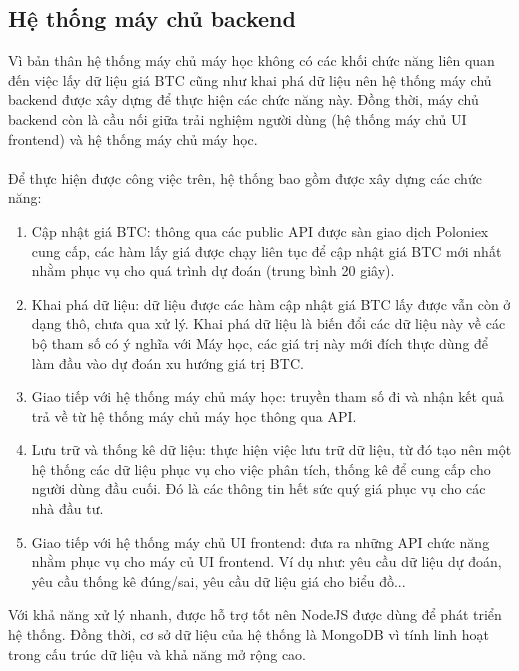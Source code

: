 \subsection{ Hệ thống máy chủ backend}
Vì bản thân hệ thống máy chủ máy học không có các khối chức năng liên quan đến 
việc lấy dữ liệu giá BTC cũng như khai phá dữ liệu nên hệ thống máy chủ backend 
được xây dựng để thực hiện các chức năng này. Đồng thời, máy chủ backend còn là 
cầu nối giữa trải nghiệm người dùng (hệ thống máy chủ UI frontend) và hệ thống 
máy chủ máy học.\\\\
Để thực hiện được công việc trên, hệ thống bao gồm được xây dựng các chức năng:
\begin{enumerate}
\item Cập nhật giá BTC: thông qua các public API được sàn giao dịch Poloniex 
cung cấp, các hàm lấy giá được chạy liên tục để cập nhật giá BTC mới nhất nhằm 
phục vụ cho quá trình dự đoán (trung bình 20 giây).
\item Khai phá dữ liệu: dữ liệu được các hàm cập nhật giá BTC lấy được vẫn 
còn ở dạng thô, chưa qua xử lý. Khai phá dữ liệu là biến đổi các dữ liệu này 
về các bộ tham số có ý nghĩa với Máy học, các giá trị này mới đích thực 
dùng để làm đầu vào dự đoán xu hướng giá trị BTC.
\item Giao tiếp với hệ thống máy chủ máy học: truyền tham số đi và nhận 
kết quả trả về từ hệ thống máy chủ máy học thông qua API.
\item Lưu trữ và thống kê dữ liệu: thực hiện việc lưu trữ dữ liệu, từ đó tạo 
nên một hệ thống các dữ liệu phục vụ cho việc phân tích, thống kê để cung cấp 
cho người dùng đầu cuối. Đó là các thông tin hết sức quý giá phục vụ cho các 
nhà đầu tư.
\item Giao tiếp với hệ thống máy chủ UI frontend: đưa ra những API chức năng 
nhằm phục vụ cho máy củ UI frontend. Ví dụ như: yêu cầu dữ liệu dự đoán, yêu 
cầu thống kê đúng/sai, yêu cầu dữ liệu giá cho biểu đồ...
\end{enumerate}
Với khả năng xử lý nhanh, được hỗ trợ tốt nên NodeJS được dùng để phát triển 
hệ thống. Đồng thời, cơ sở dữ liệu của hệ thống là MongoDB vì tính linh hoạt 
trong cấu trúc dữ liệu và khả năng mở rộng cao.

